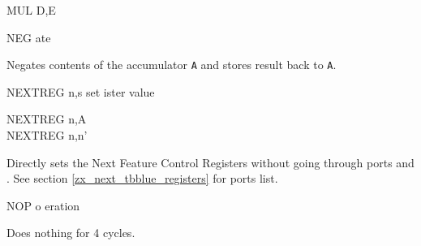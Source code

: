 \begin{basedescript}{
	\desclabelstyle{\multilinelabel}
	\desclabelwidth{3cm}}
\begin{DetailItem}{MUL D,E\ZXN}
		\begin{DetailTiming}
		\end{DetailTiming}

	\end{DetailItem}

	\begin{DetailItem}{NEG}
		{\IH{NEG}ate}
		{\SymNEG}

		Negates contents of the accumulator {\tt A} and stores result back to {\tt A}.

		\begin{DetailEffects}[p]
			\FlagsNEG
		\end{DetailEffects}
				
		\begin{DetailTiming}
			\DetailTime{2}{8}
		\end{DetailTiming}

	\end{DetailItem}

	\begin{DetailItem}{\small NEXTREG n,s{\scriptsize \ZXN}}
		{set  ister value}
		{\SymNEXTREG{s}}

		\begin{DetailVariants}
			NEXTREG n,A\\
			NEXTREG n,n'
		\end{DetailVariants}

		Directly sets the Next Feature Control Registers without going through ports  and . See section \ref{zx_next_tbblue_registers} for ports list.

		\begin{DetailEffects}
			\FlagsNEXTREGna
		\end{DetailEffects}		
		
		\begin{DetailTiming}
			\DetailTime[r,A]{4}{17}
			\DetailTime[r,n]{5}{20}
		\end{DetailTiming}

	\end{DetailItem}

	\begin{DetailItem}{NOP}
		{o eration}
		{}

		Does nothing for 4 cycles.
		
		\begin{DetailEffects}
			\FlagsNOP
		\end{DetailEffects}
						

\end{DetailItem}
\end{basedescript}
